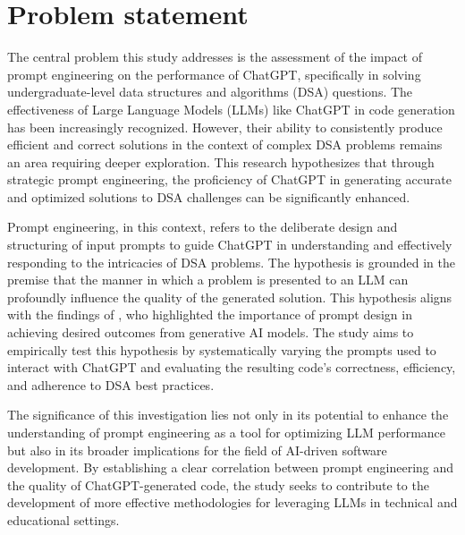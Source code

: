 \section{Problem statement}
\label{sec:intro_prob_art}
The central problem this study addresses is the assessment of the impact of prompt engineering 
on the performance of ChatGPT, specifically in solving undergraduate-level data structures and 
algorithms (DSA) questions. The effectiveness of Large Language Models (LLMs) like ChatGPT in 
code generation has been increasingly recognized. However, their ability to consistently 
produce efficient and correct solutions in the context of complex DSA problems remains an area 
requiring deeper exploration. This research hypothesizes that through strategic prompt 
engineering, the proficiency of ChatGPT in generating accurate and optimized solutions to DSA 
challenges can be significantly enhanced.

Prompt engineering, in this context, refers to the deliberate design and structuring of input 
prompts to guide ChatGPT in understanding and effectively responding to the intricacies of DSA 
problems. The hypothesis is grounded in the premise that the manner in which a problem is 
presented to an LLM can profoundly influence the quality of the generated solution. This 
hypothesis aligns with the findings of \cite{radford2019language}, who highlighted the 
importance of prompt design in achieving desired outcomes from generative AI models. The study 
aims to empirically test this hypothesis by systematically varying the prompts used to interact 
with ChatGPT and evaluating the resulting code's correctness, efficiency, and adherence to DSA 
best practices.

The significance of this investigation lies not only in its potential to enhance the 
understanding of prompt engineering as a tool for optimizing LLM performance but also in its 
broader implications for the field of AI-driven software development. By establishing a clear 
correlation between prompt engineering and the quality of ChatGPT-generated code, the study 
seeks to contribute to the development of more effective methodologies for leveraging LLMs in 
technical and educational settings.



